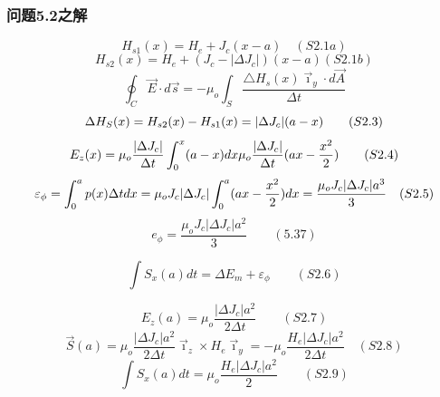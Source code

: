 \subsubsection{问题5.2之解}

\begin{equation}%
H_{s1}(x)=H_{e}+J_{c}(x-a)\quad(S2.1a)
\end{equation}
\begin{equation}%
H_{s2}(x)=H_{e}+(J_{c}-| \Delta J_{c}|)(x-a)(S2.1b)
\end{equation}
\begin{equation}%
\oint_{C}\vec{E}\cdot d\vec{s}=-\mu_{o}\int_{S}\frac{\triangle H_{s}(x)\vec{\imath}_{y}\cdot d\vec{A}}{\Delta t}
\end{equation}
\begin{equation}%
\Delta H_{S}(x)=H_{s2}(x)-H_{s1}(x)\\
=|\Delta J_{c}|(a-x)\qquad(S2.3)
\end{equation}
\begin{equation}%
E_{z}(x)=\mu_{o}\frac{|\Delta J_{c}|}{\Delta t}\int_{0}^{x}(a-x)dx\\
\mu_{o}\frac{|\Delta J_{c}|}{\Delta t}(ax-\frac{x^{2}}{2})\qquad(S2.4)
\end{equation}
\begin{equation}%
\varepsilon_{\phi}=\int_{0}^{a}p(x)\Delta tdx\\
=\mu_{o}J_{c}|\Delta J_{c}|\int_{0}^{a}(ax-\frac{x^{2}}{2})dx=\frac{\mu_{o}J_{c}|\Delta J_{c}|a^{3}}{3}\quad(S2.5)
\end{equation}
\begin{equation}%
e_{\phi}=\frac{\mu_{o}J_{c}|\Delta J_{c}|a^{2}}{3}\qquad(5.37)
\end{equation}



\begin{equation}%
\int S_{x}(a)dt=\Delta E_{m}+\varepsilon_{\phi}\qquad(S2.6)
\end{equation}



\begin{equation}%
E_{z}(a)=\mu_{o}\frac{|\Delta J_{c}|a^{2}}{2\Delta t}\qquad(S2.7)
\end{equation}
\begin{equation}%
\vec{S}(a)=\mu_{o}\frac{|\Delta J_{c}|a^{2}}{2\Delta t}\vec{\imath}_{z}\times H_{e}\vec{\imath}_{y}=-\mu_{o}\frac{H_{e}|\Delta J_{c}|a^{2}}{2\Delta t}\quad(S2.8)
\end{equation}
\begin{equation}%
\int S_{x}(a)dt=\mu_{o}\frac{H_{e}|\Delta J_{c}|a^{2}}{2}\qquad(S2.9)
\end{equation}



